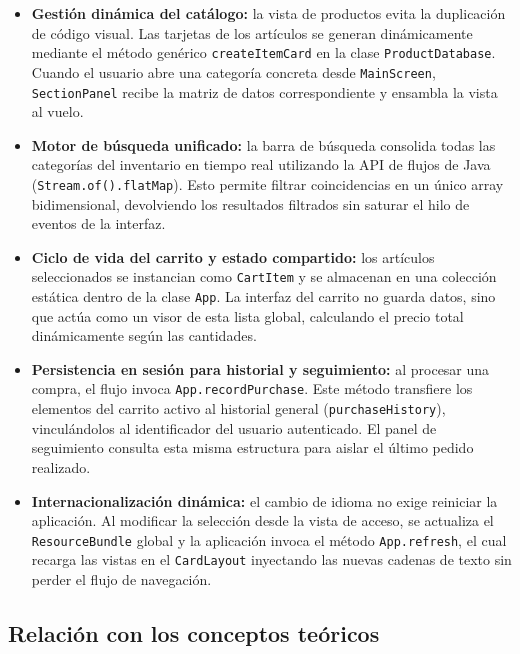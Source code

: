 \documentclass[12pt,a4paper]{article}
\begin{document}
\begin{itemize}
	\item \textbf{Gestión dinámica del catálogo:} la vista de productos evita la duplicación de código visual. Las tarjetas de los artículos se generan dinámicamente mediante el método genérico \texttt{createItemCard} en la clase \texttt{ProductDatabase}. Cuando el usuario abre una categoría concreta desde \texttt{MainScreen}, \texttt{SectionPanel} recibe la matriz de datos correspondiente y ensambla la vista al vuelo.
	\item \textbf{Motor de búsqueda unificado:} la barra de búsqueda consolida todas las categorías del inventario en tiempo real utilizando la API de flujos de Java (\texttt{Stream.of().flatMap}). Esto permite filtrar coincidencias en un único array bidimensional, devolviendo los resultados filtrados sin saturar el hilo de eventos de la interfaz.
	\item \textbf{Ciclo de vida del carrito y estado compartido:} los artículos seleccionados se instancian como \texttt{CartItem} y se almacenan en una colección estática dentro de la clase \texttt{App}. La interfaz del carrito no guarda datos, sino que actúa como un visor de esta lista global, calculando el precio total dinámicamente según las cantidades.
	\item \textbf{Persistencia en sesión para historial y seguimiento:} al procesar una compra, el flujo invoca \texttt{App.recordPurchase}. Este método transfiere los elementos del carrito activo al historial general (\texttt{purchaseHistory}), vinculándolos al identificador del usuario autenticado. El panel de seguimiento consulta esta misma estructura para aislar el último pedido realizado.
	\item \textbf{Internacionalización dinámica:} el cambio de idioma no exige reiniciar la aplicación. Al modificar la selección desde la vista de acceso, se actualiza el \texttt{ResourceBundle} global y la aplicación invoca el método \texttt{App.refresh}, el cual recarga las vistas en el \texttt{CardLayout} inyectando las nuevas cadenas de texto sin perder el flujo de navegación.
\end{itemize}

\subsection{Relación con los conceptos teóricos}
\end{document}
